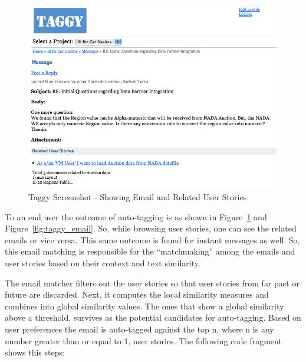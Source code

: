 \begin{figure}[tb]
	\centering
	\includegraphics[width=\textwidth]{taggy_email.png}
    \caption{Taggy Screenshot - Showing Email and Related User Stories}
	\label{fig:taggy_user_story}
\end{figure}



To an end user the outcome of auto-tagging is as shown in Figure~\ref{fig:taggy_user_story} and Figure~\ref{fig:taggy_email}. So, while browsing user stories, one can see the related emails or vice versa. This same outcome is found for instant messages as well. So, this email matching is responsible for the ``matchmaking'' among the emails and user stories based on their context and text similarity.

The email matcher filters out the user stories so that user stories from far past or future are discarded. Next, it computes the local similarity measures and combines into global similarity values. The ones that show a global similarity above a threshold, survives as the potential candidates for auto-tagging. Based on user preferences the email is auto-tagged against the top n, where n is any number greater than or equal to 1, user stories. The following code fragment shows this steps:


